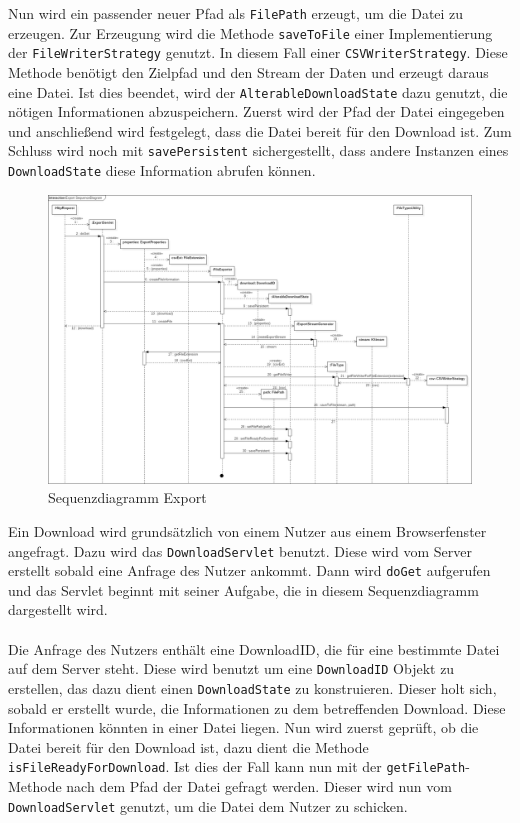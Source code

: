 Nun wird ein passender neuer Pfad als \texttt{FilePath} erzeugt, um die Datei zu erzeugen. Zur Erzeugung wird die Methode \texttt{saveToFile} einer Implementierung der \texttt{FileWriterStrategy} genutzt. In diesem Fall einer \texttt{CSVWriterStrategy}. Diese Methode benötigt den Zielpfad und den Stream der Daten und erzeugt daraus eine Datei. Ist dies beendet, wird der \texttt{AlterableDownloadState} dazu genutzt, die nötigen Informationen abzuspeichern. Zuerst wird der Pfad der Datei eingegeben und anschließend wird festgelegt, dass die Datei bereit für den Download ist. Zum Schluss wird noch mit \texttt{savePersistent} sichergestellt, dass andere Instanzen eines \texttt{DownloadState} diese Information abrufen können.
\begin{figure}[!hbp]
	\centering
	\includegraphics[width=1.25\linewidth,angle=90]{images/export/ExportSequenceDiagram.png}
	\caption{Sequenzdiagramm Export}
\end{figure}
\newpage
Ein Download wird grundsätzlich von einem Nutzer aus einem Browserfenster angefragt. Dazu wird das \texttt{DownloadServlet} benutzt. Diese wird vom Server erstellt sobald eine Anfrage des Nutzer ankommt. Dann wird \texttt{doGet} aufgerufen und das Servlet beginnt mit seiner Aufgabe, die in diesem Sequenzdiagramm dargestellt wird.\\\\
Die Anfrage des Nutzers enthält eine DownloadID, die für eine bestimmte Datei auf dem Server steht. Diese wird benutzt um eine \texttt{DownloadID} Objekt zu erstellen, das dazu dient einen \texttt{DownloadState} zu konstruieren. Dieser holt sich, sobald er erstellt wurde, die Informationen zu dem betreffenden Download. Diese Informationen könnten in einer Datei liegen. Nun wird zuerst geprüft, ob die Datei bereit für den Download ist, dazu dient die Methode \texttt{isFileReadyForDownload}. Ist dies der Fall kann nun mit der \texttt{getFilePath}-Methode nach dem Pfad der Datei gefragt werden. Dieser wird nun vom \texttt{DownloadServlet} genutzt, um die Datei dem Nutzer zu schicken.\\\\
